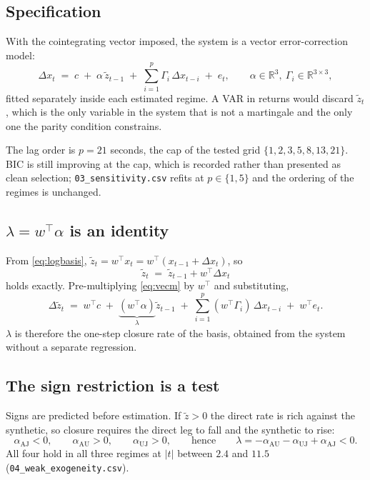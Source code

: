 \documentclass[11pt,a4paper]{article}
\newcommand{\AU}{\mathrm{AU}}
\newcommand{\UJ}{\mathrm{UJ}}
\newcommand{\AJ}{\mathrm{AJ}}
\newcommand{\code}[1]{\texttt{\small #1}}
\begin{document}
\subsection{Specification}

With the cointegrating vector imposed, the system is a vector error-correction model:
\begin{equation}
\Delta x_t \;=\; c \;+\; \alpha\, \tilde z_{t-1}
\;+\; \sum_{i=1}^{p} \Gamma_i \, \Delta x_{t-i} \;+\; e_t ,
\qquad \alpha \in \mathbb{R}^3,\ \Gamma_i \in \mathbb{R}^{3\times3},
\label{eq:vecm}
\end{equation}
fitted separately inside each estimated regime. A VAR in returns would discard $\tilde z_t$,
which is the only variable in the system that is not a martingale and the only one the
parity condition constrains.

The lag order is $p = 21$ seconds, the cap of the tested grid $\{1,2,3,5,8,13,21\}$. BIC is
still improving at the cap, which is recorded rather than presented as clean selection;
\code{03\_sensitivity.csv} refits at $p \in \{1,5\}$ and the ordering of the regimes is
unchanged.

\subsection{$\lambda = w^{\top}\alpha$ is an identity}

From \eqref{eq:logbasis}, $\tilde z_t = w^{\top}x_t = w^{\top}(x_{t-1} + \Delta x_t)$, so
\begin{equation}
\tilde z_t \;=\; \tilde z_{t-1} + w^{\top} \Delta x_t
\label{eq:zident}
\end{equation}
holds exactly. Pre-multiplying \eqref{eq:vecm} by $w^{\top}$ and substituting,
\[
\Delta \tilde z_t \;=\; w^{\top}c \;+\; \underbrace{(w^{\top}\alpha)}_{\textstyle \lambda}
\tilde z_{t-1} \;+\; \sum_{i=1}^{p} (w^{\top}\Gamma_i)\,\Delta x_{t-i} \;+\; w^{\top}e_t .
\]
$\lambda$ is therefore the one-step closure rate of the basis, obtained from the system
without a separate regression.

\subsection{The sign restriction is a test}

Signs are predicted before estimation. If $\tilde z > 0$ the direct rate is rich against the
synthetic, so closure requires the direct leg to fall and the synthetic to rise:
\[
\alpha_{\AJ} < 0, \qquad \alpha_{\AU} > 0, \qquad \alpha_{\UJ} > 0,
\qquad \text{hence} \qquad \lambda = -\alpha_{\AU} - \alpha_{\UJ} + \alpha_{\AJ} < 0 .
\]
All four hold in all three regimes at $|t|$ between $2.4$ and $11.5$
(\code{04\_weak\_exogeneity.csv}).
\end{document}

